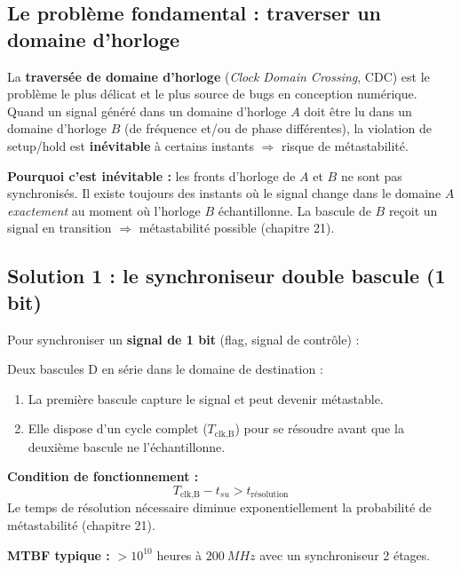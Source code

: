 \documentclass[12pt,a4paper,twoside]{book}
\begin{document}
\subsection{Le problème fondamental : traverser un domaine d'horloge}

\begin{attention}
La \textbf{traversée de domaine d'horloge} (\textit{Clock Domain Crossing}, CDC) est le problème le plus délicat et le plus source de bugs en conception numérique. Quand un signal généré dans un domaine d'horloge $A$ doit être lu dans un domaine d'horloge $B$ (de fréquence et/ou de phase différentes), la violation de setup/hold est \textbf{inévitable} à certains instants $\Rightarrow$ risque de métastabilité.
\end{attention}

\begin{formule}
\textbf{Pourquoi c'est inévitable :} les fronts d'horloge de $A$ et $B$ ne sont pas synchronisés. Il existe toujours des instants où le signal change dans le domaine $A$ \textit{exactement} au moment où l'horloge $B$ échantillonne. La bascule de $B$ reçoit un signal en transition $\Rightarrow$ métastabilité possible (chapitre 21).
\end{formule}

\subsection{Solution 1 : le synchroniseur double bascule (1 bit)}

\begin{formule}
Pour synchroniser un \textbf{signal de 1 bit} (flag, signal de contrôle) :

Deux bascules D en série dans le domaine de destination :
\begin{enumerate}[nosep]
\item La première bascule capture le signal et peut devenir métastable.
\item Elle dispose d'un cycle complet ($T_{\text{clk,B}}$) pour se résoudre avant que la deuxième bascule ne l'échantillonne.
\end{enumerate}

\textbf{Condition de fonctionnement :}
\[
T_{\text{clk,B}} - t_{su} > t_{\text{résolution}}
\]
Le temps de résolution nécessaire diminue exponentiellement la probabilité de métastabilité (chapitre 21).

\textbf{MTBF typique :} $> 10^{10}$ heures à $\SI{200}{MHz}$ avec un synchroniseur 2 étages.
\end{formule}
\end{document}
